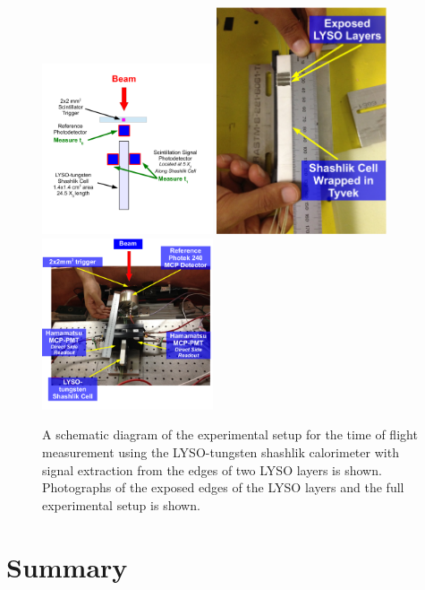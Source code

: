 \documentclass[11pt]{article}
\begin{document}
\begin{figure}[h] \centering
\includegraphics[width=0.45\textwidth]{figs/ShashlikSideReadoutSetupSchematic} 
\includegraphics[width=0.45\textwidth]{figs/ShashlikSideReadoutPhotoA} 
\includegraphics[width=0.45\textwidth]{figs/ShashlikSideReadoutPhotoB} 
\caption{ A schematic diagram of the experimental setup for the
time of flight measurement using the LYSO-tungsten shashlik calorimeter
with signal extraction from the edges of two LYSO layers is shown. Photographs
of the exposed edges of the LYSO layers and the full experimental setup is shown. } 
\label{fig:ShashlikSideReadoutSetup}
\end{figure}




\section{Summary}
\end{document}
